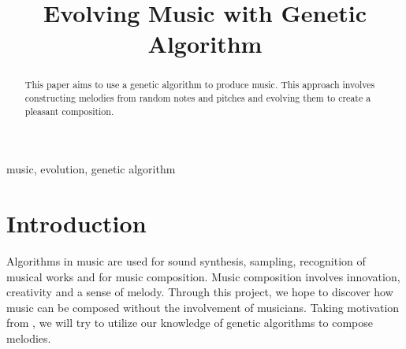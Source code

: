 \documentclass[conference]{IEEEtran}
\begin{document}
\title{Evolving Music with Genetic Algorithm%
}

\author{
\and
{}
}

\maketitle

\begin{abstract}
This paper aims to use a genetic algorithm to produce music. This approach involves constructing melodies from random notes and pitches and evolving them to create a pleasant composition.
\end{abstract}

\begin{IEEEkeywords}
music, evolution, genetic algorithm
\end{IEEEkeywords}

\section{Introduction}
Algorithms in music are used for sound synthesis, sampling, recognition of musical works and for music composition. Music composition involves innovation, creativity and a sense of melody. Through this project, we hope to discover how music can be composed without the involvement of musicians. Taking motivation from \cite{b1}, we will try to utilize our knowledge of genetic algorithms to compose melodies.
\end{document}
